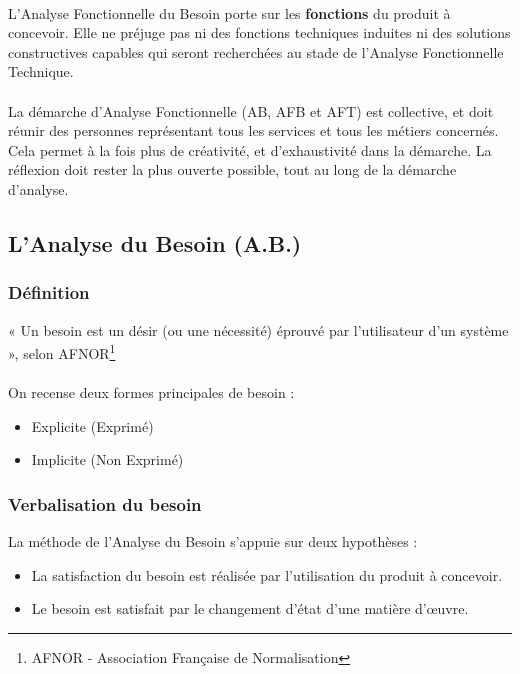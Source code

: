 \paragraph{}
L’Analyse Fonctionnelle du Besoin porte sur les \textbf{fonctions} du produit à concevoir. Elle ne préjuge pas ni des fonctions techniques induites ni des solutions constructives capables qui seront recherchées au stade de l’Analyse Fonctionnelle Technique.
\paragraph{}
La démarche d’Analyse Fonctionnelle (AB, AFB et AFT) est collective, et doit réunir des personnes représentant tous les services et tous les métiers concernés. Cela permet à la fois plus de créativité, et d’exhaustivité dans la démarche. La réflexion doit rester la plus ouverte possible, tout au long de la démarche d’analyse.

\subsection{L'Analyse du Besoin (A.B.)}

\subsubsection{Définition}
« Un besoin est un désir (ou une nécessité) éprouvé par l’utilisateur d’un système », selon AFNOR\footnote{AFNOR - Association Française de Normalisation}
\paragraph{}
On recense deux formes principales de besoin : 
\begin{itemize}
    \item Explicite (Exprimé)
    \item Implicite (Non Exprimé)
\end{itemize}

\subsubsection{Verbalisation du besoin}
La méthode de l’Analyse du Besoin s’appuie sur deux hypothèses :
\begin{itemize}
    \item La satisfaction du besoin est réalisée par l’utilisation du produit à concevoir.
    \item Le besoin est satisfait par le changement d’état d’une matière d’œuvre.
\end{itemize}

